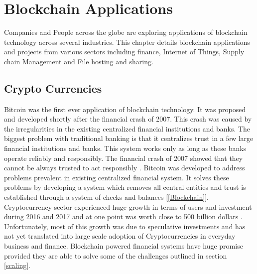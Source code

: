 \section{Blockchain Applications}
Companies and People across the globe are exploring applications of blockchain technology across several industries. This chapter details blockchain applications and projects from various sectors including finance, Internet of Things, Supply chain Management and File hosting and sharing. 
\vspace{0.5cm}  
\subsection{Crypto Currencies}
Bitcoin was the first ever application of blockchain technology. It was proposed and developed shortly after the financial crash of 2007. This crash was caused by the irregularities in the existing centralized financial institutions and banks. The biggest problem with traditional banking is that it centralizes trust in a few large financial institutions and banks. This system works only as long as these banks operate reliably and responsibly. The financial crash of 2007 showed that they cannot be always trusted to act responsibly \cite{misc:009}. Bitcoin was developed to address problems prevalent in existing centralized financial system. It solves these problems by developing a system which removes all central entities and trust is established through a system of checks and balances [\ref{Blockchain}]. Cryptocurrency sector experienced huge growth in terms of users and investment during 2016 and 2017 and at one point was worth close to 500 billion dollars \cite{misc:010}. Unfortunately, most of this growth was due to speculative investments and has not yet translated into large scale adoption of Cryptocurrencies in everyday business and finance. Blockchain powered financial systems have huge promise provided they are able to solve some of the challenges outlined in section \ref{scaling}.
\vspace{0.5cm}  
